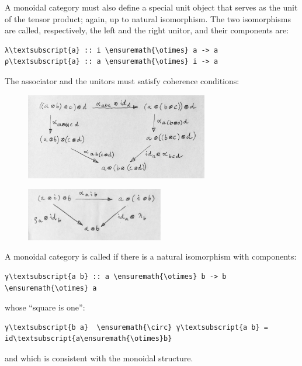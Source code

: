 A monoidal category must also define a special unit object 
that serves as the unit of the tensor product; again, up to natural
isomorphism. The two isomorphisms are called, respectively, the left and
the right unitor, and their components are:

\begin{Verbatim}[commandchars=\\\{\}]
λ\textsubscript{a} :: i \ensuremath{\otimes} a -> a
ρ\textsubscript{a} :: a \ensuremath{\otimes} i -> a
\end{Verbatim}
The associator and the unitors must satisfy coherence conditions:

\begin{figure}[H]
\centering
\includegraphics[width=80mm]{images/assoc.jpg}
\end{figure}

\begin{figure}[H]
\centering
\includegraphics[width=60mm]{images/idcoherence.jpg}
\end{figure}

\noindent
A monoidal category is called  if there is a natural
isomorphism with components:

\begin{Verbatim}[commandchars=\\\{\}]
γ\textsubscript{a b} :: a \ensuremath{\otimes} b -> b \ensuremath{\otimes} a
\end{Verbatim}
whose ``square is one'':

\begin{Verbatim}[commandchars=\\\{\}]
γ\textsubscript{b a}  \ensuremath{\circ} γ\textsubscript{a b} = id\textsubscript{a\ensuremath{\otimes}b}
\end{Verbatim}
and which is consistent with the monoidal structure.

